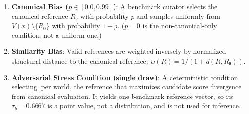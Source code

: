 \documentclass[11pt]{article}
\begin{document}
\begin{enumerate}
\item \textbf{Canonical Bias ($p \in [0.0, 0.99]$)}: A benchmark curator selects the canonical reference $R_0$ with probability $p$ and samples uniformly from $V(x) \setminus \{R_0\}$ with probability $1-p$. ($p=0$ is the non-canonical-only condition, not a uniform one.)
\item \textbf{Similarity Bias}: Valid references are weighted inversely by normalized structural distance to the canonical reference: $w(R) = 1 / (1 + d(R, R_0))$.
\item \textbf{Adversarial Stress Condition (single draw)}: A deterministic condition selecting, per world, the reference that maximizes candidate score divergence from canonical evaluation. It yields one benchmark reference vector, so its $\tau_b = 0.6667$ is a point value, not a distribution, and is not used for inference.
\end{enumerate}
\end{document}
